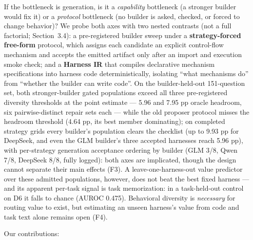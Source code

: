 If the bottleneck is generation, is it a \emph{capability} bottleneck (a
stronger builder would fix it) or a \emph{protocol} bottleneck (no
builder is asked, checked, or forced to change behavior)? We probe both
axes with two nested contrasts (not a full factorial; Section~3.4): a
pre-registered builder sweep under a \textbf{strategy-forced free-form}
protocol, which assigns each candidate an explicit control-flow
mechanism and accepts the emitted artifact only after an import and
execution smoke check; and a \textbf{Harness IR} that compiles
declarative mechanism specifications into harness code
deterministically, isolating ``what mechanisms do'' from ``whether the
builder can write code''. On the builder-held-out 151-question set, both
stronger-builder gated populations exceed all three pre-registered
diversity thresholds at the point estimate --- 5.96 and 7.95 pp oracle
headroom, six pairwise-distinct repair sets each --- while the old
proposer protocol misses the headroom threshold (4.64 pp, its best
member dominating); on completed strategy grids every builder's
population clears the checklist (up to 9.93 pp for DeepSeek, and even
the GLM builder's three accepted harnesses reach 5.96 pp), with
per-strategy generation acceptance ordering by builder (GLM 3/8, Qwen
7/8, DeepSeek 8/8, fully logged): both axes are implicated, though the
design cannot separate their main effects (F3). A leave-one-harness-out
value predictor over these admitted populations, however, does not beat
the best fixed harness --- and its apparent per-task signal is task
memorization: in a task-held-out control on D6 it falls to chance
(AUROC 0.475). Behavioral diversity is \emph{necessary} for routing
value to exist, but estimating an unseen harness's value from code and
task text alone remains open (F4).

Our contributions:


